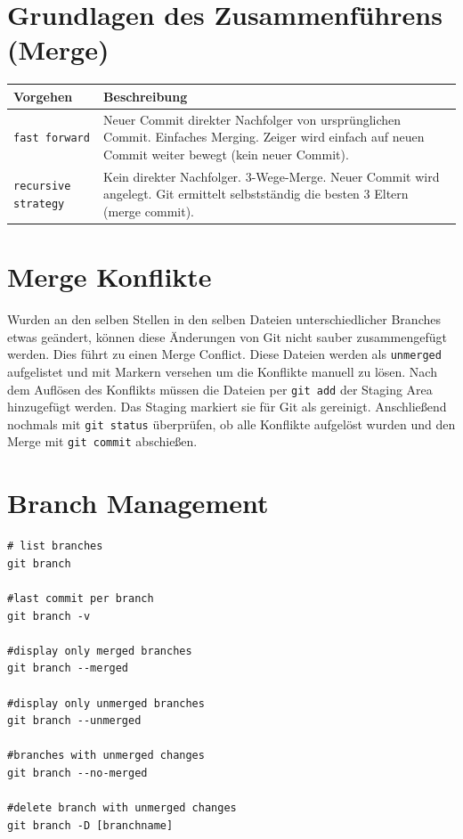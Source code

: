 \section{Grundlagen des Zusammenführens (Merge)}
\begin{center}
\renewcommand{\arraystretch}{1.2}
\begin{tabular}{|p{4cm}p{10cm}|}
\hline
\textbf{Vorgehen}			&\textbf{Beschreibung}\\
\hline
\texttt{fast forward}			&Neuer Commit direkter Nachfolger von ursprünglichen Commit. Einfaches Merging. Zeiger wird einfach auf neuen Commit weiter bewegt (kein neuer Commit).\\
\hline
\texttt{recursive strategy}		&Kein direkter Nachfolger. 3-Wege-Merge. Neuer Commit wird angelegt. Git ermittelt selbstständig die besten 3 Eltern (merge commit).\\
\hline
\end{tabular}
\renewcommand{\arraystretch}{1}
\end{center}
\section{Merge Konflikte}
Wurden an den selben Stellen in den selben Dateien unterschiedlicher Branches etwas geändert, können diese Änderungen von Git nicht sauber zusammengefügt werden. Dies führt zu einen Merge Conflict. Diese Dateien werden als \texttt{unmerged} aufgelistet und mit Markern versehen um die Konflikte manuell zu lösen. Nach dem Auflösen des Konflikts müssen die Dateien per \texttt{git add} der Staging Area hinzugefügt werden. Das Staging markiert sie für Git als gereinigt. Anschließend nochmals mit \texttt{git status} überprüfen, ob alle Konflikte aufgelöst wurden und den Merge mit \texttt{git commit} abschießen.
\section{Branch Management}
\begin{lstlisting}[caption={Branch Management},captionpos=b]
# list branches
git branch

#last commit per branch
git branch -v

#display only merged branches
git branch --merged

#display only unmerged branches
git branch --unmerged

#branches with unmerged changes
git branch --no-merged

#delete branch with unmerged changes
git branch -D [branchname]
\end{lstlisting}
